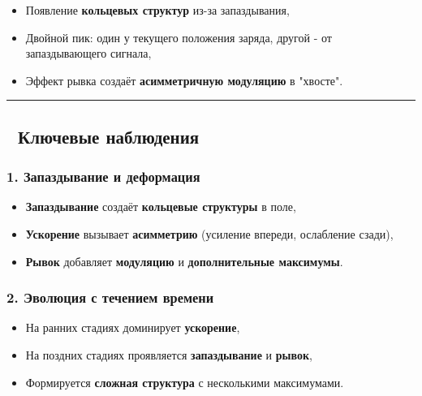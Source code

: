 \documentclass[11pt]{article}
\providecommand{\tightlist}{%
      \setlength{\itemsep}{0pt}\setlength{\parskip}{0pt}}
\begin{document}
\begin{itemize}
\tightlist
\item
  Появление \textbf{кольцевых структур} из-за запаздывания,
\item
  Двойной пик: один у текущего положения заряда, другой - от
  запаздывающего сигнала,
\item
  Эффект рывка создаёт \textbf{асимметричную модуляцию} в "хвосте".
\end{itemize}

\begin{center}\rule{0.5\linewidth}{\linethickness}\end{center}

\subsection{🔹 Ключевые
наблюдения}\label{ux43aux43bux44eux447ux435ux432ux44bux435-ux43dux430ux431ux43bux44eux434ux435ux43dux438ux44f}

\subsubsection{\texorpdfstring{1. \textbf{Запаздывание и
деформация}}{1. Запаздывание и деформация}}\label{ux437ux430ux43fux430ux437ux434ux44bux432ux430ux43dux438ux435-ux438-ux434ux435ux444ux43eux440ux43cux430ux446ux438ux44f}

\begin{itemize}
\tightlist
\item
  \textbf{Запаздывание} создаёт \textbf{кольцевые структуры} в поле,
\item
  \textbf{Ускорение} вызывает \textbf{асимметрию} (усиление впереди,
  ослабление сзади),
\item
  \textbf{Рывок} добавляет \textbf{модуляцию} и \textbf{дополнительные
  максимумы}.
\end{itemize}

\subsubsection{\texorpdfstring{2. \textbf{Эволюция с течением
времени}}{2. Эволюция с течением времени}}\label{ux44dux432ux43eux43bux44eux446ux438ux44f-ux441-ux442ux435ux447ux435ux43dux438ux435ux43c-ux432ux440ux435ux43cux435ux43dux438}

\begin{itemize}
\tightlist
\item
  На ранних стадиях доминирует \textbf{ускорение},
\item
  На поздних стадиях проявляется \textbf{запаздывание} и \textbf{рывок},
\item
  Формируется \textbf{сложная структура} с несколькими максимумами.
\end{itemize}
\end{document}
